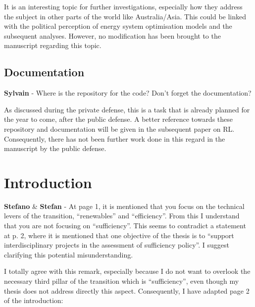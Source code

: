 \documentclass[12pt,a4paper]{article}
\begin{document}
\noindent
It is an interesting topic for further investigations, especially how they address the subject in other parts of the world like Australia/Asia. This could be linked with the political perception of energy system optimisation models and the subsequent analyses. However, no modification has been brought to the manuscript regarding this topic.

\subsection{Documentation}
\label{documentation}

\begin{mdframed}[style=comment] %
{\color{purple} \textbf{Sylvain}} - Where is the repository for the code? Don't forget the documentation?
\end{mdframed}

\noindent As discussed during the private defense, this is a task that is already planned for the year to come, after the public defense. A better reference towards these repository and documentation will be given in the subsequent paper on RL. Consequently, there has not been further work done in this regard in the manuscript by the public defense.

\section{Introduction}
\label{Introduction}

\begin{mdframed}[style=comment] %
{\color{orange} \textbf{Stefano}} \& {\color{teal} \textbf{Stefan}} - At page 1, it is mentioned that you focus on the technical levers of the transition, ``renewables'' and ``efficiency''. From this I understand that you are not focusing on ``sufficiency''. This seems to contradict a statement at p. 2, where it is mentioned that one objective of the thesis is to ``support interdisciplinary projects in the assessment of sufficiency policy''. I suggest clarifying this potential misunderstanding.  
\end{mdframed}

\noindent I totally agree with this remark, especially because I do not want to overlook the necessary third pillar of the transition which is ``sufficiency'', even though my thesis does not address directly this aspect. Consequently, I have adapted {\color{blue} page 2 of the introduction}:
\end{document}
